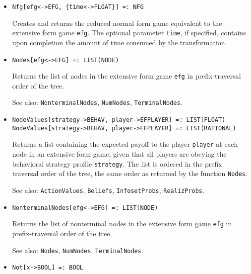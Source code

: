 \begin{itemize}
\item
\protect \large \begin{verbatim}
Nfg[efg<->EFG, {time<->FLOAT}] =: NFG
\end{verbatim}\normalsize

\bd
Creates and returns the reduced normal form game equivalent
to the extensive form game \verb+efg+.  The optional parameter \verb+time+,
if specified, contains upon completion the amount of time consumed by
the transformation.
\ed

\item
\protect \large \begin{verbatim} 
Nodes[efg<->EFG] =: LIST(NODE)
\end{verbatim}\normalsize

\bd
Returns the list of nodes in the extensive form game
\verb+efg+ in prefix-traversal order of the tree.
\item
[See also:] {\tt NonterminalNodes}, {\tt NumNodes}, {\tt TerminalNodes}.
\ed

\item
\protect \large \begin{verbatim}
NodeValues[strategy->BEHAV, player->EFPLAYER] =: LIST(FLOAT)
NodeValues[strategy->BEHAV, player->EFPLAYER] =: LIST(RATIONAL)
\end{verbatim}\normalsize

\bd
Returns a list containing the expected payoff to the player \verb+player+
at each node in an extensive form game, given that all players are obeying
the behavioral strategy profile \verb+strategy+.  The list is ordered
in the prefix traversal order of the tree, the same order as returned
by the function {\tt Nodes}.
\item
[See also:] {\tt ActionValues}, {\tt Beliefs}, {\tt InfosetProbs},
{\tt RealizProbs}.
\ed

\item
\protect \large \begin{verbatim} 
NonterminalNodes[efg<->EFG] =: LIST(NODE)
\end{verbatim}\normalsize

\bd
Returns the list of nonterminal nodes in the extensive form
game \verb+efg+ in prefix-traversal order of the tree.
\item
[See also:] {\tt Nodes}, {\tt NumNodes}, {\tt TerminalNodes}.
\ed

\item
\protect \large \begin{verbatim}
Not[x->BOOL] =: BOOL
\end{verbatim}\normalsize


\end{itemize}
